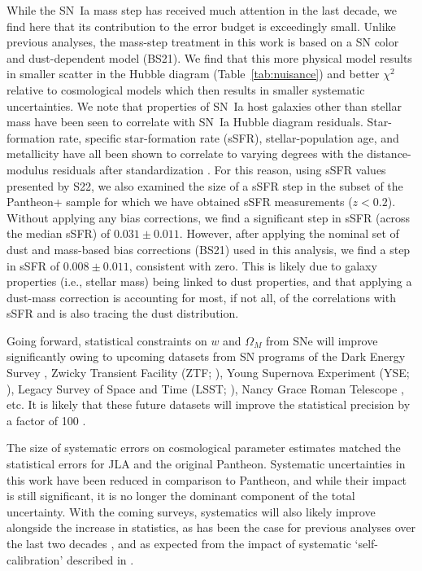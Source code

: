 \documentclass[twocolumn]{aastex63}
\begin{document}
While the SN~Ia mass step has received much attention in the last decade, we find here that its contribution to the error budget is exceedingly small. Unlike previous analyses, the mass-step treatment in this work is based on a SN color and dust-dependent model (BS21). We find that this more physical model results in smaller scatter in the Hubble diagram (Table~\ref{tab:nuisance}) and better $\chi^2$ relative to cosmological models which then results in smaller systematic uncertainties. We note that properties of SN~Ia host galaxies other than stellar mass have been seen to correlate with SN~Ia Hubble diagram residuals. Star-formation rate, specific star-formation rate (sSFR), stellar-population age, and metallicity have all been shown to correlate to varying degrees with the distance-modulus residuals after standardization \citep{Sullivan2010,Lampeitl2010,Childress2013,Rose19,Rigault2013}. For this reason, {using sSFR values presented by S22}, we also examined the size of a sSFR step in the subset of the Pantheon+ sample for which we have obtained sSFR measurements ($z<0.2$). Without applying any bias corrections, we find a significant step in sSFR (across the median sSFR) of $0.031\pm0.011$. However, after applying the nominal set of dust and mass-based bias corrections (BS21) used in this analysis, we find {a step in sSFR of} $0.008\pm0.011$, consistent with zero. This is likely due to galaxy properties (i.e., stellar mass) being linked to dust properties, and that applying a dust-mass correction is accounting for most, if not all, of the correlations with sSFR and is also tracing the dust distribution.


Going forward, statistical constraints on $w$ and $\Omega_M$ from SNe will improve significantly owing to upcoming datasets from SN programs of the Dark Energy Survey \citep{D'Andrea18}, Zwicky Transient Facility (ZTF; \citealt{Dhawan22}), Young Supernova Experiment (YSE; \citealp{Jones21}), Legacy Survey of Space and Time (LSST; \citealp{Mandelbaum18,Sanchez21}), Nancy Grace Roman Telescope \citep{Hounsell18}, etc.  It is likely that these future datasets will improve the statistical precision by a factor of 100 \citep{ScolnicKilo}. 

{ The size of systematic errors on cosmological parameter estimates matched the statistical errors for JLA and the original Pantheon.  Systematic uncertainties in this work have been reduced in comparison to Pantheon, and while their impact is still significant, it is no longer the dominant component of the total uncertainty. With the coming surveys,} systematics will also likely improve alongside the increase in statistics, as has been the case for previous analyses over the last two decades {, and as expected from the impact of systematic `self-calibration' described in \cite{binning21}}. 
\end{document}
